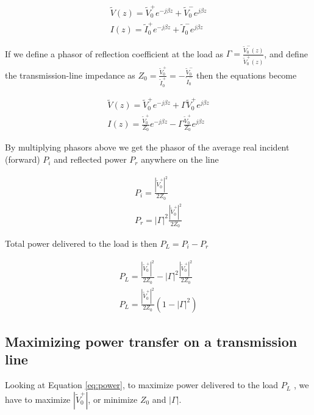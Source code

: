 \documentclass{ximera}
\begin{document}
\begin{eqnarray}
\tilde{V}(z)=\tilde{V}_0^+ e^{-j\beta z} + \tilde{V}_0^- e^{j\beta z}\label{eq4} \\
I(z)=\tilde{I}_0^+ e^{-j\beta z} + \tilde{I}_0^- e^{j\beta z}\label{eq5}
\end{eqnarray}

If we define a phasor of reflection coefficient at the load as $\Gamma =\frac{\tilde{V}^-_0(z)}{\tilde{V}^+_0(z)}$, and define the transmission-line impedance as $Z_0=\frac{\tilde{V}_0^+}{\tilde{I}_0^+}=-\frac{\tilde{V}_0^-}{\tilde{I}_0^-}$ then the equations become

\begin{eqnarray}
\tilde{V}(z)=\tilde{V}_0^+ e^{-j\beta z} + \Gamma \tilde{V}_0^+ e^{j\beta z}\label{eq4b} \\
I(z)=\frac{\tilde{V}_0^+}{Z_0} e^{-j\beta z} - \Gamma \frac{\tilde{V}_0^+}{Z_0} e^{j\beta z}\label{eq5b}
\end{eqnarray}

By multiplying phasors above we get the phasor of the average real incident (forward) $P_i$ and reflected power $P_r$ anywhere on the line

\begin{eqnarray}
P_i=\frac{|\tilde{V}_0^+|^2}{2 Z_0} \\
P_r= |\Gamma|^2 \frac{|\tilde{V}_0^+|^2}{2 Z_0}
\end{eqnarray}

Total power delivered to the load is then  $P_L=P_i-P_r$

\begin{eqnarray}
P_L=\frac{|\tilde{V}_0^+|^2}{2 Z_0} - |\Gamma|^2 \frac{|\tilde{V}_0^+|^2}{2 Z_0} \\
P_L=\frac{|\tilde{V}_0^+|^2}{2 Z_0} (1-|\Gamma|^2 ) \label{eq:power}
\end{eqnarray}


\subsection{Maximizing power transfer on a transmission line}

Looking at Equation \ref{eq:power}, to maximize power delivered to the load $P_L$  , we have to maximize $|\tilde{V}_0^+|$, or minimize $Z_0$ and $|\Gamma|$. 
\end{document}
